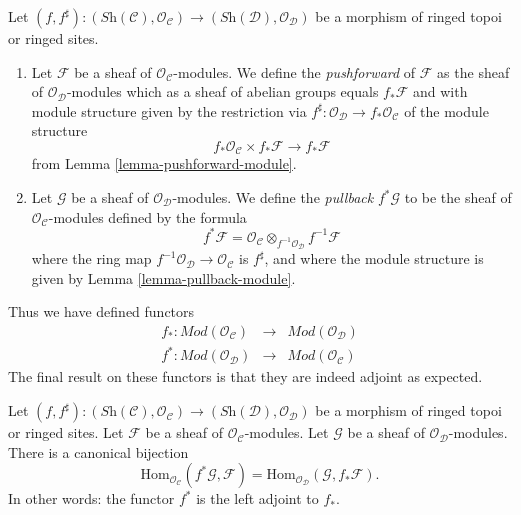 \begin{definition}
\label{definition-pushforward}
Let
$(f, f^\sharp) :
(\textit{Sh}(\mathcal{C}), \mathcal{O}_{\mathcal{C}})
\to
(\textit{Sh}(\mathcal{D}), \mathcal{O}_{\mathcal{D}})$
be a morphism of ringed topoi or ringed sites.
\begin{enumerate}
\item Let $\mathcal{F}$ be a sheaf of $\mathcal{O}_{\mathcal{C}}$-modules.
We define the {\it pushforward} of $\mathcal{F}$ as the
sheaf of $\mathcal{O}_{\mathcal{D}}$-modules which as a sheaf
of abelian groups equals $f_*\mathcal{F}$ and with
module structure given by the restriction
via $f^\sharp : \mathcal{O}_{\mathcal{D}} \to f_*\mathcal{O}_{\mathcal{C}}$
of the module structure
$$
f_*\mathcal{O}_{\mathcal{C}} \times f_*\mathcal{F}
\longrightarrow
f_*\mathcal{F}
$$
from Lemma \ref{lemma-pushforward-module}.
\item Let $\mathcal{G}$ be a sheaf of $\mathcal{O}_{\mathcal{D}}$-modules.
We define the {\it pullback} $f^*\mathcal{G}$ to be the
sheaf of $\mathcal{O}_{\mathcal{C}}$-modules defined by the formula
$$
f^*\mathcal{F}
=
\mathcal{O}_{\mathcal{C}} \otimes_{f^{-1}\mathcal{O}_{\mathcal{D}}}
f^{-1}\mathcal{F}
$$
where the ring map
$f^{-1}\mathcal{O}_{\mathcal{D}} \to \mathcal{O}_{\mathcal{C}}$
is $f^\sharp$, and where the  module
structure is given by Lemma \ref{lemma-pullback-module}.
\end{enumerate}
\end{definition}

\noindent
Thus we have defined functors
\begin{eqnarray*}
f_* : \textit{Mod}(\mathcal{O}_{\mathcal{C}})
& \longrightarrow &
\textit{Mod}(\mathcal{O}_{\mathcal{D}}) \\
f^* : \textit{Mod}(\mathcal{O}_{\mathcal{D}})
& \longrightarrow &
\textit{Mod}(\mathcal{O}_{\mathcal{C}})
\end{eqnarray*}
The final result on these functors is that they are indeed
adjoint as expected.

\begin{lemma}
\label{lemma-adjoint-pullback-pushforward-modules}
Let
$(f, f^\sharp) :
(\textit{Sh}(\mathcal{C}), \mathcal{O}_{\mathcal{C}})
\to
(\textit{Sh}(\mathcal{D}), \mathcal{O}_{\mathcal{D}})$
be a morphism of ringed topoi or ringed sites.
Let $\mathcal{F}$ be a sheaf of $\mathcal{O}_{\mathcal{C}}$-modules.
Let $\mathcal{G}$ be a sheaf of $\mathcal{O}_{\mathcal{D}}$-modules.
There is a canonical bijection
$$
\text{Hom}_{\mathcal{O}_{\mathcal{C}}}(f^*\mathcal{G}, \mathcal{F})
=
\text{Hom}_{\mathcal{O}_{\mathcal{D}}}(\mathcal{G}, f_*\mathcal{F}).
$$
In other words: the functor $f^*$ is the left adjoint to
$f_*$.
\end{lemma}

